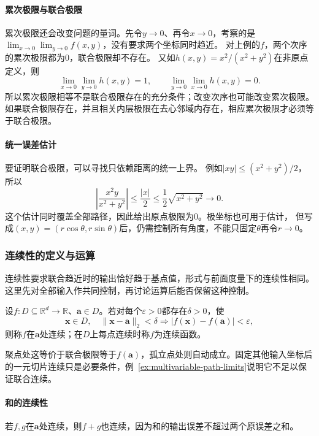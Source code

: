\paragraph{累次极限与联合极限}
累次极限还会改变问题的量词。先令$y\to0$、再令$x\to0$，考察的是
$\lim_{x\to0}\lim_{y\to0}f(x,y)$，没有要求两个坐标同时趋近。
对上例的$f$，两个次序的累次极限都为$0$，联合极限却不存在。
又如$h(x,y)=x^2/(x^2+y^2)$在非原点定义，则
\[
 \lim_{x\to0}\lim_{y\to0}h(x,y)=1,
 \qquad
 \lim_{y\to0}\lim_{x\to0}h(x,y)=0.
\]
所以累次极限相等不是联合极限存在的充分条件；改变次序也可能改变累次极限。
如果联合极限存在，并且相关内层极限在去心邻域内存在，相应累次极限才必须等于联合极限。

\paragraph{统一误差估计}
要证明联合极限，可以寻找只依赖距离的统一上界。
例如$|xy|\leq(x^2+y^2)/2$，所以
\[
 \left|\frac{x^2y}{x^2+y^2}\right|
 \leq \frac{|x|}{2}
 \leq\frac12\sqrt{x^2+y^2}\longrightarrow0.
\]
这个估计同时覆盖全部路径，因此给出原点极限为$0$。极坐标也可用于估计，
但写成$(x,y)=(r\cos\theta,r\sin\theta)$后，仍需控制所有角度，不能只固定$\theta$再令$r\to0$。

\subsubsection{连续性的定义与运算}
\label{sec:multivariable-continuity}

连续性要求联合趋近时的输出恰好趋于基点值，形式与前面度量下的连续性相同。
这里先对全部输入作共同控制，再讨论运算后能否保留这种控制。
\begin{definition}[多元标量函数的连续性]
\label{def:multivariable-scalar-continuity}
设$f:D\subseteq\mathbb R^d\to\mathbb R$、$\bm a\in D$。若对每个$\varepsilon>0$都存在$\delta>0$，使
\[
 \bm x\in D,\quad\lVert\bm x-\bm a\rVert_2<\delta
 \Longrightarrow |f(\bm x)-f(\bm a)|<\varepsilon,
\]
则称$f$在$\bm a$处连续；在$D$上每点连续时称$f$为连续函数。
\end{definition}
聚点处这等价于联合极限等于$f(\bm a)$，孤立点处则自动成立。固定其他输入坐标后的一元切片连续只是必要条件，例~\ref{ex:multivariable-path-limits}说明它不足以保证联合连续。

\paragraph{和的连续性}
若$f,g$在$\bm a$处连续，则$f+g$也连续，因为和的输出误差不超过两个原误差之和。

